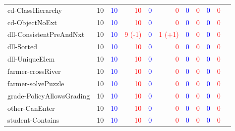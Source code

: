 \documentclass{article}
\begin{document}
\begin{table}[ht]
{\begin{tabular}{lrrrrrrrrrr}
cd-ClassHierarchy              & 10 & \textcolor{blue}{10}  & \textcolor{red}{10}   & \textcolor{blue}{0}  & \textcolor{red}{0}   & \textcolor{blue}{0}  & \textcolor{red}{0}   & \textcolor{blue}{0}  & \textcolor{red}{0}   \\
cd-ObjectNoExt                 & 10 & \textcolor{blue}{10}  & \textcolor{red}{10}   & \textcolor{blue}{0}  & \textcolor{red}{0}   & \textcolor{blue}{0}  & \textcolor{red}{0}   & \textcolor{blue}{0}  & \textcolor{red}{0}   \\
dll-ConsistentPreAndNxt        & 10 & \textcolor{blue}{10}  & \textcolor{red}{9 (-1)}   & \textcolor{blue}{0}  & \textcolor{red}{1 (+1)}   & \textcolor{blue}{0}  & \textcolor{red}{0}   & \textcolor{blue}{0}  & \textcolor{red}{0}   \\
dll-Sorted                     & 10 & \textcolor{blue}{10}  & \textcolor{red}{10}   & \textcolor{blue}{0}  & \textcolor{red}{0}   & \textcolor{blue}{0}  & \textcolor{red}{0}   & \textcolor{blue}{0}  & \textcolor{red}{0}   \\
dll-UniqueElem                 & 10 & \textcolor{blue}{10}  & \textcolor{red}{10}   & \textcolor{blue}{0}  & \textcolor{red}{0}   & \textcolor{blue}{0}  & \textcolor{red}{0}   & \textcolor{blue}{0}  & \textcolor{red}{0}   \\
farmer-crossRiver              & 10 & \textcolor{blue}{10}  & \textcolor{red}{10}   & \textcolor{blue}{0}  & \textcolor{red}{0}   & \textcolor{blue}{0}  & \textcolor{red}{0}   & \textcolor{blue}{0}  & \textcolor{red}{0}   \\
farmer-solvePuzzle             & 10 & \textcolor{blue}{10}  & \textcolor{red}{10}   & \textcolor{blue}{0}  & \textcolor{red}{0}   & \textcolor{blue}{0}  & \textcolor{red}{0}   & \textcolor{blue}{0}  & \textcolor{red}{0}   \\
grade-PolicyAllowsGrading      & 10 & \textcolor{blue}{10}  & \textcolor{red}{10}   & \textcolor{blue}{0}  & \textcolor{red}{0}   & \textcolor{blue}{0}  & \textcolor{red}{0}   & \textcolor{blue}{0}  & \textcolor{red}{0}   \\
other-CanEnter                 & 10 & \textcolor{blue}{10}  & \textcolor{red}{10}   & \textcolor{blue}{0}  & \textcolor{red}{0}   & \textcolor{blue}{0}  & \textcolor{red}{0}   & \textcolor{blue}{0}  & \textcolor{red}{0}   \\
student-Contains               & 10 & \textcolor{blue}{10}  & \textcolor{red}{10}   & \textcolor{blue}{0}  & \textcolor{red}{0}   & \textcolor{blue}{0}  & \textcolor{red}{0}   & \textcolor{blue}{0}  & \textcolor{red}{0}   \\

\end{tabular}}
\end{table}
\end{document}
